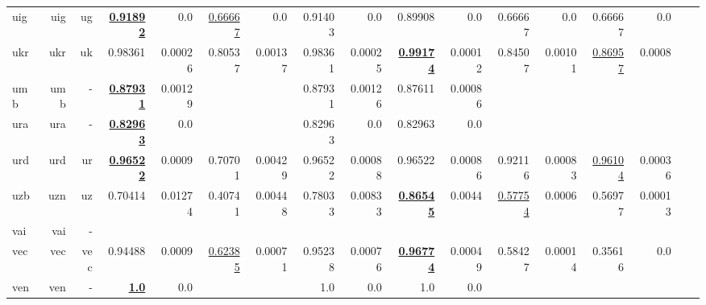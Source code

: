 \documentclass[11pt]{article}
\begin{document}
\begin{table*}[h]
{\begin{tabular}{lrrrrrrrrrrrrrrrr}
uig         & uig         & ug         & \textbf{\underline{0.91892}}         & 0.0         & \underline{0.66667}         & 0.0         & 0.91403         & 0.0         & 0.89908         & 0.0         & 0.66667         & 0.0         & 0.66667         & 0.0         \\
ukr         & ukr         & uk         & 0.98361         & 0.00026         & 0.80537         & 0.00137         & 0.98361         & 0.00025         & \textbf{\underline{0.99174}}         & 0.00012         & 0.84507         & 0.00101         & \underline{0.86957}         & 0.0008         \\
umb         & umb         & -         & \textbf{\underline{0.87931}}         & 0.00129         &          &          & 0.87931         & 0.00126         & 0.87611         & 0.00086         &          &          &          &          \\
ura         & ura         & -         & \textbf{\underline{0.82963}}         & 0.0         &          &          & 0.82963         & 0.0         & 0.82963         & 0.0         &          &          &          &          \\
urd         & urd         & ur         & \textbf{\underline{0.96522}}         & 0.0009         & 0.70701         & 0.00429         & 0.96522         & 0.00088         & 0.96522         & 0.00086         & 0.92116         & 0.00083         & \underline{0.96104}         & 0.00036         \\
uzb         & uzn         & uz         & 0.70414         & 0.01274         & 0.40741         & 0.00448         & 0.78033         & 0.00833         & \textbf{\underline{0.86545}}         & 0.0044         & \underline{0.57754}         & 0.0006         & 0.56977         & 0.00013         \\
vai         & vai         & -         &          &          &          &          &          &          &          &          &          &          &          &          \\
vec         & vec         & vec         & 0.94488         & 0.0009         & \underline{0.62385}         & 0.00071         & 0.95238         & 0.00076         & \textbf{\underline{0.96774}}         & 0.00049         & 0.58427         & 0.00014         & 0.35616         & 0.0         \\
ven         & ven         & -         & \textbf{\underline{1.0}}         & 0.0         &          &          & 1.0         & 0.0         & 1.0         & 0.0         &          &          &          &          \\

\end{tabular}}
\end{table*}
\end{document}
